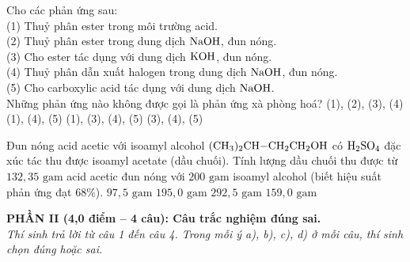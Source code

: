 \documentclass[12pt,a4paper]{article}
\begin{document}
\begin{ex}
Cho các phản ứng sau:\\
(1) Thuỷ phân ester trong môi trường acid.\\
(2) Thuỷ phân ester trong dung dịch $\ce{NaOH}$, đun nóng.\\
(3) Cho ester tác dụng với dung dịch $\ce{KOH}$, đun nóng.\\
(4) Thuỷ phân dẫn xuất halogen trong dung dịch $\ce{NaOH}$, đun nóng.\\
(5) Cho carboxylic acid tác dụng với dung dịch $\ce{NaOH}$.\\
Những phản ứng nào không được gọi là phản ứng xà phòng hoá?
\choice
{(1), (2), (3), (4)}
{\True (1), (4), (5)}
{(1), (3), (4), (5)}
{(3), (4), (5)}
\end{ex}

\begin{ex}
Đun nóng acid acetic với isoamyl alcohol $\ce{(CH3)2CH-CH2CH2OH}$ có $\ce{H2SO4}$ đặc xúc tác thu được isoamyl acetate (dầu chuối). Tính lượng dầu chuối thu được từ $132{,}35\text{ gam}$ acid acetic đun nóng với $200\text{ gam}$ isoamyl alcohol (biết hiệu suất phản ứng đạt 68\%).
\choice
{$97{,}5\text{ gam}$}
{\True $195{,}0\text{ gam}$}
{$292{,}5\text{ gam}$}
{$159{,}0\text{ gam}$}
\end{ex}


\vspace{0.3cm}
\noindent
\textbf{PHẦN II (4,0 điểm -- 4 câu): Câu trắc nghiệm đúng sai.}\\
\textit{Thí sinh trả lời từ câu 1 đến câu 4. Trong mỗi ý a), b), c), d) ở mỗi câu, thí sinh chọn đúng hoặc sai.}
\end{document}

